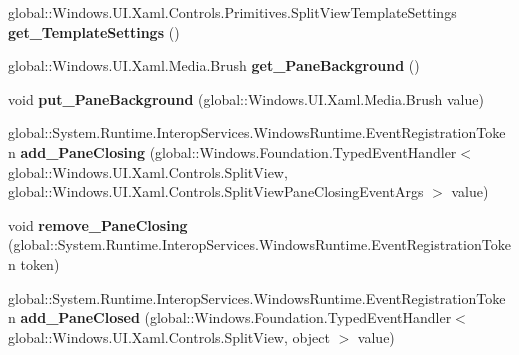\begin{DoxyCompactItemize}
\mbox{\label{interface_windows_1_1_u_i_1_1_xaml_1_1_controls_1_1_i_split_view_a5d410ee30d731de0a395a350b650dabb}} 
global\+::\+Windows.\+U\+I.\+Xaml.\+Controls.\+Primitives.\+Split\+View\+Template\+Settings {\bfseries get\+\_\+\+Template\+Settings} ()
\item 
\mbox{\label{interface_windows_1_1_u_i_1_1_xaml_1_1_controls_1_1_i_split_view_a1c78e9b7f929fa0f024bfd75bd93b2b3}} 
global\+::\+Windows.\+U\+I.\+Xaml.\+Media.\+Brush {\bfseries get\+\_\+\+Pane\+Background} ()
\item 
\mbox{\label{interface_windows_1_1_u_i_1_1_xaml_1_1_controls_1_1_i_split_view_a097467d9287cc5b1864024d0d471fe18}} 
void {\bfseries put\+\_\+\+Pane\+Background} (global\+::\+Windows.\+U\+I.\+Xaml.\+Media.\+Brush value)
\item 
\mbox{\label{interface_windows_1_1_u_i_1_1_xaml_1_1_controls_1_1_i_split_view_a69ee46b94201df4d3b787eb9e974289a}} 
global\+::\+System.\+Runtime.\+Interop\+Services.\+Windows\+Runtime.\+Event\+Registration\+Token {\bfseries add\+\_\+\+Pane\+Closing} (global\+::\+Windows.\+Foundation.\+Typed\+Event\+Handler$<$ global\+::\+Windows.\+U\+I.\+Xaml.\+Controls.\+Split\+View, global\+::\+Windows.\+U\+I.\+Xaml.\+Controls.\+Split\+View\+Pane\+Closing\+Event\+Args $>$ value)
\item 
\mbox{\label{interface_windows_1_1_u_i_1_1_xaml_1_1_controls_1_1_i_split_view_a6264ad76174d999d605b9e7745a813f6}} 
void {\bfseries remove\+\_\+\+Pane\+Closing} (global\+::\+System.\+Runtime.\+Interop\+Services.\+Windows\+Runtime.\+Event\+Registration\+Token token)
\item 
\mbox{\label{interface_windows_1_1_u_i_1_1_xaml_1_1_controls_1_1_i_split_view_a5a3d86d9589e5de24342d96eaf2c1c61}} 
global\+::\+System.\+Runtime.\+Interop\+Services.\+Windows\+Runtime.\+Event\+Registration\+Token {\bfseries add\+\_\+\+Pane\+Closed} (global\+::\+Windows.\+Foundation.\+Typed\+Event\+Handler$<$ global\+::\+Windows.\+U\+I.\+Xaml.\+Controls.\+Split\+View, object $>$ value)

\end{DoxyCompactItemize}
